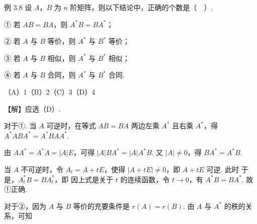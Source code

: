 \begin{fcard}{例 3.8}
设 $A$，$B$ 为 $n$ 阶矩阵，则以下结论中，正确的个数是（　）.

① 若 $AB=BA$，则 $A^*B=BA^*$；

② 若 $A$ 与 $B$ 等价，则 $A^*$ 与 $B^*$ 等价；

③ 若 $A$ 与 $B$ 相似，则 $A^*$ 与 $B^*$ 相似；

④ 若 $A$ 与 $B$ 合同，则 $A^*$ 与 $B^*$ 合同.

（A）1\qquad（B）2\qquad（C）3\qquad（D）4
\end{fcard}

【解】应选（D）.

对于①. 当 $A$ 可逆时，在等式 $AB=BA$ 两边左乘 $A^*$ 且右乘 $A^*$，得 $A^*ABA^*=A^*BAA^*$.

由 $AA^*=A^*A=|A|E$，可得 $|A|BA^*=|A|A^*B$. 又 $|A|\ne0$，得 $BA^*=A^*B$.

当 $A$ 不可逆时，令 $A_t=A+tE$，使得 $|A+tE|\ne0$，即 $A+tE$ 可逆. 此时
于是，$A_t^*B=BA_t^*$，即
因上式是关于 $t$ 的连续函数，令 $t\to0$，有 $A^*B=BA^*$. 故①正确.

对于②，因为 $A$ 与 $B$ 等价的充要条件是 $r(A)=r(B)$. 由 $A$ 与 $A^*$ 的秩的关系，可知



